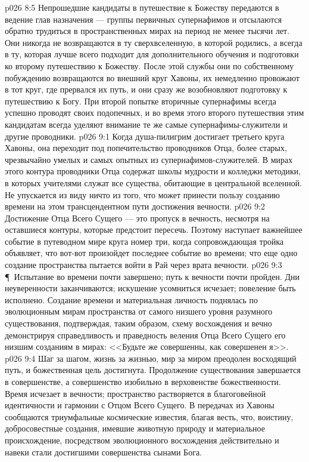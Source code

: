 \vs p026 8:5 Непрошедшие кандидаты в путешествие к Божеству передаются в ведение глав назначения --- группы первичных супернафимов и отсылаются обратно трудиться в пространственных мирах на период не менее тысячи лет. Они никогда не возвращаются в ту сверхвселенную, в которой родились, а всегда в ту, которая лучше всего подходит для дополнительного обучения и подготовки ко второму путешествию к Божеству. После этой службы они по собственному побуждению возвращаются во внешний круг Хавоны, их немедленно провожают в тот круг, где прервался их путь, и они сразу же возобновляют подготовку к путешествию к Богу. При второй попытке вторичные супернафимы всегда успешно проводят своих подопечных, и во время этого второго путешествия этим кандидатам всегда уделяют внимание те же самые супернафимы\hyp{}служители и другие проводники.
\vs p026 9:1 Когда душа\hyp{}пилигрим достигает третьего круга Хавоны, она переходит под попечительство проводников Отца, более старых, чрезвычайно умелых и самых опытных из супернафимов\hyp{}служителей. В мирах этого контура проводники Отца содержат школы мудрости и колледжи методики, в которых учителями служат все существа, обитающие в центральной вселенной. Не упускается из виду ничто из того, что может принести пользу созданию времени на этом трансцендентном пути достижения вечности.
\vs p026 9:2 Достижение Отца Всего Сущего --- это пропуск в вечность, несмотря на оставшиеся контуры, которые предстоит пересечь. Поэтому наступает важнейшее событие в путеводном мире круга номер три, когда сопровождающая тройка объявляет, что вот\hyp{}вот произойдет последнее событие во времени; что еще одно создание пространства пытается войти в Рай через врата вечности.
\vs p026 9:3 \P\ Испытание во времени почти завершено; путь к вечности почти пройден. Дни неуверенности заканчиваются; искушение усомниться исчезает; повеление быть  исполнено. Создание времени и материальная личность поднялась по эволюционным мирам пространства от самого низшего уровня разумного существования, подтверждая, таким образом, схему восхождения и вечно демонстрируя справедливость и праведность веления Отца Всего Сущего его низшим созданиям в мирах: <<Будьте же совершенны, как совершенен я>>.
\vs p026 9:4 Шаг за шагом, жизнь за жизнью, мир за миром преодолен восходящий путь, и божественная цель достигнута. Продолжение существования завершается в совершенстве, а совершенство изобильно в верховенстве божественности. Время исчезает в вечности; пространство растворяется в благоговейной идентичности и гармонии с Отцом Всего Сущего. В передачах из Хавоны сообщаются триумфальные космические известия, благая весть, что, воистину, добросовестные создания, имевшие животную природу и материальное происхождение, посредством эволюционного восхождения действительно и навеки стали достигшими совершенства сынами Бога.

